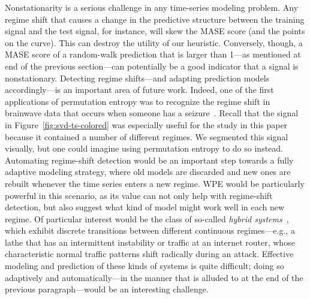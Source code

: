 Nonstationarity is a serious challenge in any time-series modeling
problem.  Any regime shift that causes a change in the predictive
structure between the training signal and the test signal, for
instance, will skew the MASE score (and the points on the curve).
This can destroy the utility of our heuristic.  \alert{Conversely,
  though,} a MASE score of a random-walk prediction that is larger
than 1---as mentioned at end of the previous section---can potentially
be a good indicator that a signal is nonstationary.  Detecting regime
shifts---and adapting prediction models accordingly---is an important
area of future work.  Indeed, one of the first applications of
permutation entropy was to recognize the regime shift in brainwave
data that occurs when someone has a seizure~\cite{cao2004det}.  Recall
that the signal in Figure~\ref{fig:svd-ts-colored} was especially
useful for the study in this paper because it contained a number of
different regimes.  We segmented this signal visually, but one could
imagine using permutation entropy to do so instead.  Automating
regime-shift detection would be an important step towards a fully
adaptive modeling strategy, where old models are discarded and new
ones are rebuilt whenever the time series enters a new regime.  WPE
would be particularly powerful in this scenario, as its value can not
only help with regime-shift detection, but also suggest what kind of
model might work well in each new regime.  Of particular interest
would be the class of so-called \emph{hybrid systems}~\cite{hybrid},
which exhibit discrete transitions between different continuous
regimes---e.g., a lathe that has an intermittent instability or
traffic at an internet router, whose characteristic normal traffic
patterns shift radically during an attack.  Effective modeling and
prediction of these kinds of systems is quite difficult; doing so
adaptively and automatically---in the manner that is alluded to at the
end of the previous paragraph---would be an interesting challenge.


